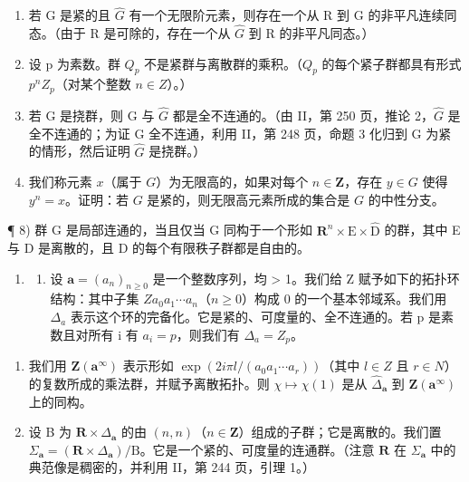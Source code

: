 \begin{enumerate}
\def\labelenumi{\arabic{enumi})}
\setcounter{enumi}{3}
\item
  若 G 是紧的且 \(\widehat{G}\) 有一个无限阶元素，则存在一个从 R 到 G 的非平凡连续同态。（由于 R 是可除的，存在一个从 \(\widehat{G}\) 到 R 的非平凡同态。）
\item
  设 p 为素数。群 \(Q_{p}\) 不是紧群与离散群的乘积。（\(Q_{p}\) 的每个紧子群都具有形式 \(p^{n}Z_{p}\)（对某个整数 \(n \in Z\)）。）
\item
  若 G 是挠群，则 G 与 \(\widehat{G}\) 都是全不连通的。（由 II，第 250 页，推论 2，\(\widehat{G}\) 是全不连通的；为证 G 全不连通，利用 II，第 248 页，命题 3 化归到 G 为紧的情形，然后证明 \(\widehat{G}\) 是挠群。）
\item
  我们称元素 \(x\)（属于 \(G\)）为无限高的，如果对每个 \(n \in \mathbf{Z}\)，存在 \(y \in G\) 使得 \(y^n = x\)。证明：若 \(G\) 是紧的，则无限高元素所成的集合是 \(G\) 的中性分支。
\end{enumerate}

¶ 8) 群 G 是局部连通的，当且仅当 G 同构于一个形如 \(\mathbf{R}^{n}\times\mathrm{E}\times\widehat{\mathrm{D}}\) 的群，其中 E 与 D 是离散的，且 D 的每个有限秩子群都是自由的。

\begin{enumerate}
\def\labelenumi{\arabic{enumi})}
\setcounter{enumi}{8}
\tightlist
\item
  \begin{enumerate}
  \def\labelenumii{\alph{enumii})}
  \tightlist
  \item
    设 \(\boldsymbol{a}=(a_{n})_{n\geqslant0}\) 是一个整数序列，均 \textgreater{} 1。我们给 Z 赋予如下的拓扑环结构：其中子集 \(Za_{0}a_{1}\cdots a_{n}\)（\(n\geqslant0\)）构成 0 的一个基本邻域系。我们用 \(\Delta_{a}\) 表示这个环的完备化。它是紧的、可度量的、全不连通的。若 p 是素数且对所有 i 有 \(a_{i}=p\)，则我们有 \(\Delta_{a}=Z_{p}\)。
  \end{enumerate}
\end{enumerate}

\begin{enumerate}
\def\labelenumi{\alph{enumi})}
\setcounter{enumi}{1}
\item
  我们用 \(\mathbf{Z}(\boldsymbol{a}^{\infty})\) 表示形如 \(\exp(2i\pi l/(a_{0}a_{1}\cdots a_{r}))\)（其中 \(l \in Z\) 且 \(r \in N\)）的复数所成的乘法群，并赋予离散拓扑。则 \(\chi \mapsto \chi(1)\) 是从 \(\widehat{\Delta}_{\boldsymbol{a}}\) 到 \(\mathbf{Z}(\boldsymbol{a}^{\infty})\) 上的同构。
\item
  设 B 为 \(\mathbf{R} \times \Delta_{\boldsymbol{a}}\) 的由 \((n, n)\)（\(n \in \mathbf{Z}\)）组成的子群；它是离散的。我们置 \(\Sigma_{\boldsymbol{a}} = (\mathbf{R} \times \Delta_{\boldsymbol{a}})/\mathrm{B}\)。它是一个紧的、可度量的连通群。（注意 \(\mathbf{R}\) 在 \(\Sigma_{\boldsymbol{a}}\) 中的典范像是稠密的，并利用 II，第 244 页，引理 1。）
\end{enumerate}

